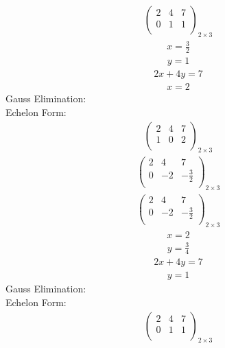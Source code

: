 \documentclass{article}
\begin{document}
\begin{align*}
\left(
\begin{array}{cc|c}
2 & 4 & 7\\
0 & 1 & 1\\
\end{array}
\right)_{2\times 3}
\end{align*}
\begin{align*}
x=\frac{3}{2}\end{align*}
\begin{align*}
y=1\end{align*}
\begin{align*}
2x + 4y=7\end{align*}
\begin{align*}
x=2\end{align*}
Gauss Elimination:\\
Echelon Form:\\
\begin{align*}
\left(
\begin{array}{cc|c}
2 & 4 & 7\\
1 & 0 & 2\\
\end{array}
\right)_{2\times 3}
\end{align*}
\begin{align*}
\left(
\begin{array}{cc|c}
2 & 4 & 7\\
0 & -2 & -\frac{3}{2}\\
\end{array}
\right)_{2\times 3}
\end{align*}
\begin{align*}
\left(
\begin{array}{cc|c}
2 & 4 & 7\\
0 & -2 & -\frac{3}{2}\\
\end{array}
\right)_{2\times 3}
\end{align*}
\begin{align*}
x=2\end{align*}
\begin{align*}
y=\frac{3}{4}\end{align*}
\begin{align*}
2x + 4y=7\end{align*}
\begin{align*}
y=1\end{align*}
Gauss Elimination:\\
Echelon Form:\\
\begin{align*}
\left(
\begin{array}{cc|c}
2 & 4 & 7\\
0 & 1 & 1\\
\end{array}
\right)_{2\times 3}
\end{align*}
\end{document}

